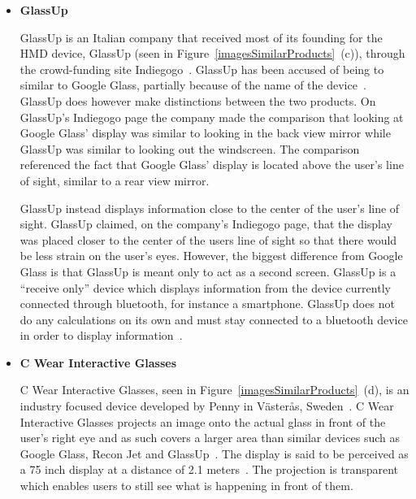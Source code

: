 \begin{itemize}
Unlike Google Glass, Recon Jet's display is located below the user's line of sight, as seen in Figure~\ref{imagesSimilarProducts}. Recon Jet's target audience, athletes, are used to having their information below line of sight. For instance a bike may have dashboard mounted to the handlebar, or an athlete might be using a watch to check the time. Google Glass is meant to be worn at all times while the location and the brightness of the display indicates that Recon Jet, however, is meant to only be used while the athlete is working out and not more regularly.

\item \textbf{GlassUp}~\cite{glassUp}

GlassUp is an Italian company that received most of its founding for the HMD device, GlassUp (seen in Figure~\ref{imagesSimilarProducts}~(c)), through the crowd-funding site Indiegogo~\cite{glassUpIndiegogo}. GlassUp has been accused of being to similar to Google Glass, partially because of the name of the device~\cite{glassUpLegal}. GlassUp does however make distinctions between the two products. On GlassUp's Indiegogo page the company made the comparison that looking at Google Glass' display was similar to looking in the back view mirror while GlassUp was similar to looking out the windscreen. The comparison referenced the fact that Google Glass' display is located above the user's line of sight, similar to a rear view mirror.

GlassUp instead displays information close to the center of the user's line of sight. GlassUp claimed, on the company's Indiegogo page, that the display was placed closer to the center of the users line of sight so that there would be less strain on the user's eyes. However, the biggest difference from Google Glass is that GlassUp is meant only to act as a second screen. GlassUp is a ``receive only'' device which displays information from the device currently connected through bluetooth, for instance a smartphone. GlassUp does not do any calculations on its own and must stay connected to a bluetooth device in order to display information~\cite{glassUpIndiegogo}.

\item \textbf{C Wear Interactive Glasses}~\cite{penny}

C Wear Interactive Glasses, seen in Figure~\ref{imagesSimilarProducts}~(d), is an industry focused device developed by Penny in V{\"a}ster{\aa}s, Sweden~\cite{pennyCompany}. C Wear Interactive Glasses projects an image onto the actual glass in front of the user's right eye and as such covers a larger area than similar devices such as Google Glass, Recon Jet and GlassUp~\cite{pennyDisplay}. The display is said to be perceived as a 75 inch display at a distance of 2.1 meters~\cite{pennyProducts}. The projection is transparent which enables users to still see what is happening in front of them.


\end{itemize}
